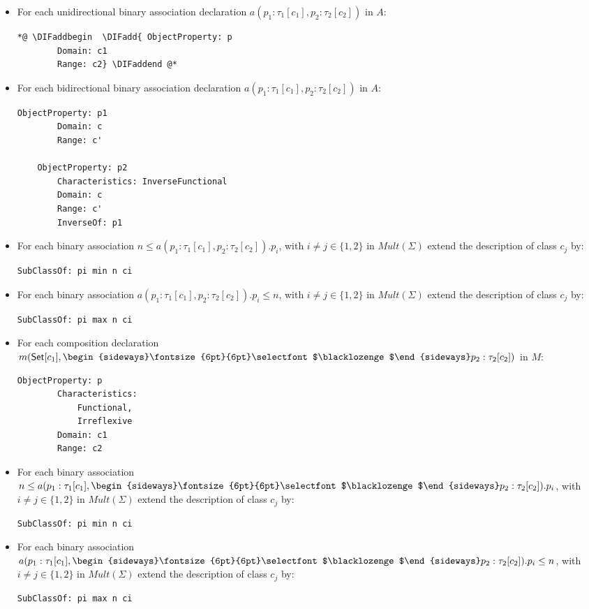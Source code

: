 \documentclass[10pt,fleqn,final]{scrreprt}
\newcommand{\composition}{\raisebox{0.2pt}{\begin{sideways}\fontsize{6pt}{6pt}\selectfont$\blacklozenge$\end{sideways}}}
\providecommand{\DIFadd}[1]{{\protect\color{blue}\uwave{#1}}} %
\providecommand{\DIFaddbegin}{} %
\providecommand{\DIFaddend}{} %
\begin{document}
\begin{itemize}
\item For each unidirectional binary association declaration $a(p_1:\tau_1[c_1],p_2:\tau_2[c_2])$ in $A$:
 \begin{lstlisting}[language=owl2Manchester]
	*@ \DIFaddbegin  \DIFadd{ ObjectProperty: p
		Domain: c1
		Range: c2} \DIFaddend @* 
\end{lstlisting}
\item For each bidirectional binary association declaration $a(p_1:\tau_1[c_1],p_2:\tau_2[c_2])$ in $A$:
 \begin{lstlisting}[language=owl2Manchester]
	ObjectProperty: p1
		Domain: c
		Range: c'

	ObjectProperty: p2
		Characteristics: InverseFunctional
		Domain: c
		Range: c'
		InverseOf: p1
\end{lstlisting}
\item For each binary association $n \leq a(p_1:\tau_1[c_1],p_2:\tau_2[c_2]).p_i$, with $i \neq j\in\{1,2\}$ in $\mathit{Mult}(\Sigma)$ extend the description of class $c_j$ by:
 \begin{lstlisting}[language=owl2Manchester]
	SubClassOf: pi min n ci
\end{lstlisting}
\item For each binary association $a(p_1:\tau_1[c_1],p_2:\tau_2[c_2]).p_i \leq n$, with $i \neq j\in\{1,2\}$  in $\mathit{Mult}(\Sigma)$ extend the description of class $c_j$ by:
 \begin{lstlisting}[language=owl2Manchester]
	SubClassOf: pi max n ci
\end{lstlisting}
\item For each composition declaration $m(\mathsf{Set}[c_1], \composition p_2 :
\tau_2[c_2])$ in $M$:
\begin{lstlisting}[language=owl2Manchester]
	ObjectProperty: p
		Characteristics:
			Functional, 
			Irreflexive
		Domain: c1
		Range: c2
\end{lstlisting}
\item For each binary association $n \leq a(p_1:\tau_1[c_1], \composition p_2:\tau_2[c_2]).p_i$, with $i \neq j\in\{1,2\}$  in $\mathit{Mult}(\Sigma)$  extend the description of class $c_j$ by:
\begin{lstlisting}[language=owl2Manchester]
	SubClassOf: pi min n ci
\end{lstlisting}
\item For each binary association $a(p_1:\tau_1[c_1], \composition p_2:\tau_2[c_2]).p_i \leq n$, with $i \neq j\in\{1,2\}$  in $\mathit{Mult}(\Sigma)$ extend the description of class $c_j$ by:
\begin{lstlisting}[language=owl2Manchester]
	SubClassOf: pi max n ci
\end{lstlisting}
\end{itemize}
\end{document}
